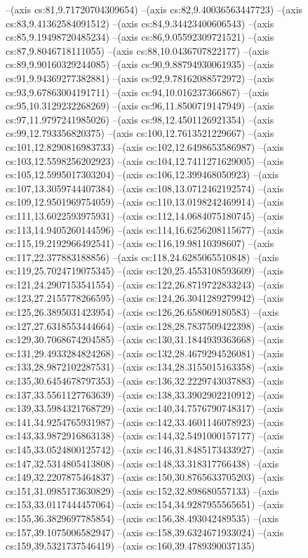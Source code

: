 --(axis cs:81,9.71720704309654)
--(axis cs:82,9.40036563447723)
--(axis cs:83,9.41362584091512)
--(axis cs:84,9.34423400606543)
--(axis cs:85,9.19498720485234)
--(axis cs:86,9.05592309721521)
--(axis cs:87,9.8046718111055)
--(axis cs:88,10.0436707822177)
--(axis cs:89,9.90160329244085)
--(axis cs:90,9.88794930061935)
--(axis cs:91,9.94369277382881)
--(axis cs:92,9.78162088572972)
--(axis cs:93,9.67863004191711)
--(axis cs:94,10.016237366867)
--(axis cs:95,10.3129232268269)
--(axis cs:96,11.8500719147949)
--(axis cs:97,11.9797241985026)
--(axis cs:98,12.4501126921354)
--(axis cs:99,12.793356820375)
--(axis cs:100,12.7613521229667)
--(axis cs:101,12.8290816983733)
--(axis cs:102,12.6498653586987)
--(axis cs:103,12.5598256202923)
--(axis cs:104,12.7411271629005)
--(axis cs:105,12.5995017303204)
--(axis cs:106,12.399468050923)
--(axis cs:107,13.3059744407384)
--(axis cs:108,13.0712462192574)
--(axis cs:109,12.9501969754059)
--(axis cs:110,13.0198242469914)
--(axis cs:111,13.6022593975931)
--(axis cs:112,14.0684075180745)
--(axis cs:113,14.9405260144596)
--(axis cs:114,16.6256208115677)
--(axis cs:115,19.2192966492541)
--(axis cs:116,19.98110398607)
--(axis cs:117,22.377883188856)
--(axis cs:118,24.6285065510848)
--(axis cs:119,25.7024719075345)
--(axis cs:120,25.4553108593609)
--(axis cs:121,24.2907153541554)
--(axis cs:122,26.8719722833243)
--(axis cs:123,27.2155778266595)
--(axis cs:124,26.3041289279942)
--(axis cs:125,26.3895031423954)
--(axis cs:126,26.658069180583)
--(axis cs:127,27.6318553444664)
--(axis cs:128,28.7837509422398)
--(axis cs:129,30.7068674204585)
--(axis cs:130,31.1844939363668)
--(axis cs:131,29.4933284824268)
--(axis cs:132,28.4679294526081)
--(axis cs:133,28.9872102287531)
--(axis cs:134,28.3155015163358)
--(axis cs:135,30.6454678797353)
--(axis cs:136,32.2229743037883)
--(axis cs:137,33.5561127763639)
--(axis cs:138,33.3902902210912)
--(axis cs:139,33.5984321768729)
--(axis cs:140,34.7576790748317)
--(axis cs:141,34.9254765931987)
--(axis cs:142,33.4601146078923)
--(axis cs:143,33.9872916863138)
--(axis cs:144,32.5491000157177)
--(axis cs:145,33.0524800125742)
--(axis cs:146,31.8485173433927)
--(axis cs:147,32.5314805413808)
--(axis cs:148,33.318317766438)
--(axis cs:149,32.2207875464837)
--(axis cs:150,30.8765633705203)
--(axis cs:151,31.0985173630829)
--(axis cs:152,32.898680557133)
--(axis cs:153,33.0117444457064)
--(axis cs:154,34.9287955565651)
--(axis cs:155,36.3829697785854)
--(axis cs:156,38.493042489535)
--(axis cs:157,39.1075006582947)
--(axis cs:158,39.6324671933024)
--(axis cs:159,39.5321737546419)
--(axis cs:160,39.4789390037135)
